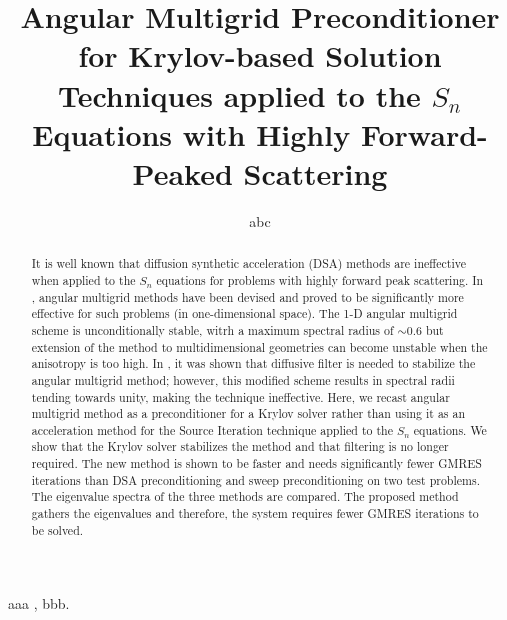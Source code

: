 \documentclass[preprint,10pt]{elsarticle}
\renewcommand{\(}{\left(}
\renewcommand{\)}{\right)}
\renewcommand{\[}{\left[}
\renewcommand{\]}{\right]}
\begin{document}
\begin{frontmatter}



\title{Angular Multigrid Preconditioner for Krylov-based Solution Techniques
applied to the $S_n$ Equations with Highly Forward-Peaked Scattering}
\author{abc} 

\begin{abstract}
It is well known that diffusion synthetic acceleration (DSA) methods are ineffective 
when applied to the $S_n$ equations for problems with highly forward peak scattering. 
In \cite{multigrid_1d}, angular multigrid methods have been devised and proved to be 
significantly more effective for such problems (in one-dimensional space). 
The 1-D angular multigrid scheme is unconditionally stable, witrh a maximum spectral radius of $\sim0.6$
but extension of the method to multidimensional geometries can become unstable when the anisotropy is too
high. In \cite{multigrid_2d}, it was shown that diffusive filter is needed to stabilize the angular multigrid method;
however, this modified scheme results in spectral radii tending towards unity, making the technique ineffective.
Here, we recast angular multigrid method as a
preconditioner for a Krylov solver rather than using it as an acceleration
method for the Source Iteration technique applied to the $S_n$ equations. 
We show that the Krylov solver stabilizes the method and that filtering is no longer required. 
The new method is shown to be faster and
needs significantly fewer GMRES iterations than DSA preconditioning and sweep
preconditioning on two test problems. The eigenvalue spectra of the three
methods are compared. The proposed method gathers the eigenvalues and therefore, the
system requires fewer GMRES iterations to be solved.
\end{abstract}

\begin{keyword}
aaa \sep
bbb.
\end{keyword}
\end{frontmatter}
\end{document}

